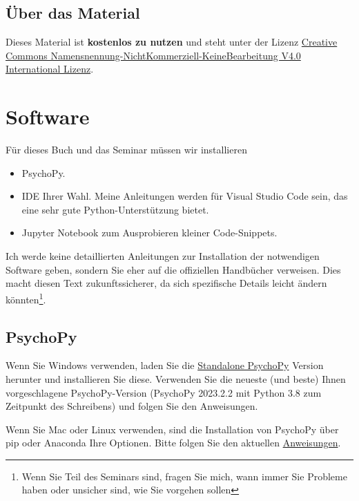 \documentclass[
]{book}
\providecommand{\tightlist}{%
  \setlength{\itemsep}{0pt}\setlength{\parskip}{0pt}}
\begin{document}
\hypertarget{uxfcber-das-material}{%
\section{Über das Material}\label{uxfcber-das-material}}

Dieses Material ist \textbf{kostenlos zu nutzen} und steht unter der Lizenz \href{https://creativecommons.org/licenses/by-nc-nd/4.0/}{Creative Commons Namensnennung-NichtKommerziell-KeineBearbeitung V4.0 International Lizenz}.

\hypertarget{Software}{%
\chapter{Software}\label{Software}}

Für dieses Buch und das Seminar müssen wir installieren

\begin{itemize}
\tightlist
\item
  PsychoPy.
\item
  IDE Ihrer Wahl. Meine Anleitungen werden für Visual Studio Code sein, das eine sehr gute Python-Unterstützung bietet.
\item
  Jupyter Notebook zum Ausprobieren kleiner Code-Snippets.
\end{itemize}

Ich werde keine detaillierten Anleitungen zur Installation der notwendigen Software geben, sondern Sie eher auf die offiziellen Handbücher verweisen. Dies macht diesen Text zukunftssicherer, da sich spezifische Details leicht ändern könnten\footnote{Wenn Sie Teil des Seminars sind, fragen Sie mich, wann immer Sie Probleme haben oder unsicher sind, wie Sie vorgehen sollen}.

\hypertarget{install-psychopy}{%
\section{PsychoPy}\label{install-psychopy}}

Wenn Sie Windows verwenden, laden Sie die \href{https://www.psychopy.org/download.html}{Standalone PsychoPy} Version herunter und installieren Sie diese. Verwenden Sie die neueste (und beste) Ihnen vorgeschlagene PsychoPy-Version (PsychoPy 2023.2.2 mit Python 3.8 zum Zeitpunkt des Schreibens) und folgen Sie den Anweisungen.

Wenn Sie Mac oder Linux verwenden, sind die Installation von PsychoPy über pip oder Anaconda Ihre Optionen. Bitte folgen Sie den aktuellen \href{https://www.psychopy.org/download.html\#manual-installations}{Anweisungen}.
\end{document}
